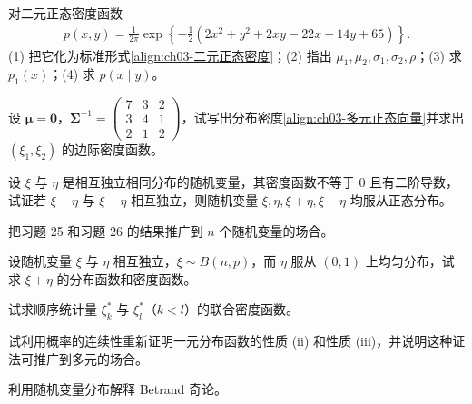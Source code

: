 \documentclass[../../main.tex]{subfiles}
\begin{document}
\begin{exercise}\label{exercise:ch03-41}
对二元正态密度函数
\begin{align*}p(x,y)=\frac{1}{2\pi}\exp\left\{-\frac{1}{2}(2x^{2}+y^{2}+2xy-22x-14y+65)\right\}.\end{align*}
(1) 把它化为标准形式\eqref{align:ch03-二元正态密度}；(2) 指出 $\mu_1,\mu_2,\sigma_1,\sigma_2,\rho$；(3) 求 $p_1(x)$；(4) 求 $p(x\mid y)$。
\end{exercise}

\begin{exercise}\label{exercise:ch03-42}
设 $\boldsymbol{\mu}=\boldsymbol{0}$，$\boldsymbol{\Sigma}^{-1}=\begin{pmatrix}7&3&2\\3&4&1\\2&1&2\end{pmatrix}$，试写出分布密度\eqref{align:ch03-多元正态向量}并求出 $(\xi_1,\xi_2)$ 的边际密度函数。
\end{exercise}

\begin{exercise}\label{exercise:ch03-43}
设 $\xi$ 与 $\eta$ 是相互独立相同分布的随机变量，其密度函数不等于 $0$ 且有二阶导数，试证若 $\xi+\eta$ 与 $\xi-\eta$ 相互独立，则随机变量 $\xi,\eta,\xi+\eta,\xi-\eta$ 均服从正态分布。
\end{exercise}

\begin{exercise}\label{exercise:ch03-44}
把习题 25 和习题 26 的结果推广到 $n$ 个随机变量的场合。
\end{exercise}

\begin{exercise}\label{exercise:ch03-45}
设随机变量 $\xi$ 与 $\eta$ 相互独立，$\xi\sim B(n,p)$，而 $\eta$ 服从 $(0,1)$ 上均匀分布，试求 $\xi+\eta$ 的分布函数和密度函数。
\end{exercise}

\begin{exercise}\label{exercise:ch03-46}
试求顺序统计量 $\xi_k^{*}$ 与 $\xi_l^{*}$（$k<l$）的联合密度函数。
\end{exercise}

\begin{exercise}\label{exercise:ch03-47}
试利用概率的连续性重新证明一元分布函数的性质 (ii) 和性质 (iii)，并说明这种证法可推广到多元的场合。
\end{exercise}

\begin{exercise}\label{exercise:ch03-48}
利用随机变量分布解释 Betrand 奇论。
\end{exercise}
\end{document}
